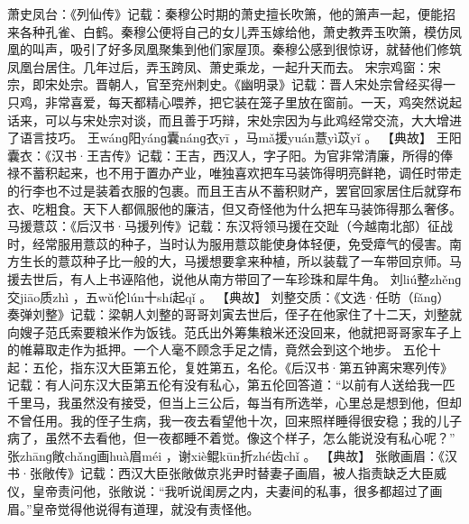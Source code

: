 \documentclass[12pt,UTF8]{ctexbook}
\begin{document}
萧史凤台：《列仙传》记载：秦穆公时期的萧史擅长吹箫，他的箫声一起，便能招来各种孔雀、白鹤。秦穆公便将自己的女儿弄玉嫁给他，萧史教弄玉吹箫，模仿凤凰的叫声，吸引了好多凤凰聚集到他们家屋顶。秦穆公感到很惊讶，就替他们修筑凤凰台居住。几年过后，弄玉跨凤、萧史乘龙，一起升天而去。
宋宗鸡窗：宋宗，即宋处宗。晋朝人，官至兖州刺史。《幽明录》记载：晋人宋处宗曾经买得一只鸡，非常喜爱，每天都精心喂养，把它装在笼子里放在窗前。一天，鸡突然说起话来，可以与宋处宗对谈，而且善于巧辩，宋处宗因为与此鸡经常交流，大大增进了语言技巧。
王wánɡ阳yánɡ囊nánɡ衣yī
，马mǎ援yuán薏yì苡yǐ
。
【典故】
王阳囊衣：《汉书·王吉传》记载：王吉，西汉人，字子阳。为官非常清廉，所得的俸禄不蓄积起来，也不用于置办产业，唯独喜欢把车马装饰得明亮鲜艳，调任时带走的行李也不过是装着衣服的包裹。而且王吉从不蓄积财产，罢官回家居住后就穿布衣、吃粗食。天下人都佩服他的廉洁，但又奇怪他为什么把车马装饰得那么奢侈。
马援薏苡：《后汉书·马援列传》记载：东汉将领马援在交趾（今越南北部）征战时，经常服用薏苡的种子，当时认为服用薏苡能使身体轻便，免受瘴气的侵害。南方生长的薏苡种子比一般的大，马援想要拿来种植，所以装载了一车带回京师。马援去世后，有人上书诬陷他，说他从南方带回了一车珍珠和犀牛角。
刘liú整zhěnɡ交jiāo质zhì
，五wǔ伦lún十shí起qǐ
。
【典故】
刘整交质：《文选·任昉（fǎnɡ）奏弹刘整》记载：梁朝人刘整的哥哥刘寅去世后，侄子在他家住了十二天，刘整就向嫂子范氏索要粮米作为饭钱。范氏出外筹集粮米还没回来，他就把哥哥家车子上的帷幕取走作为抵押。一个人毫不顾念手足之情，竟然会到这个地步。
五伦十起：五伦，指东汉大臣第五伦，复姓第五，名伦。《后汉书·第五钟离宋寒列传》记载：有人问东汉大臣第五伦有没有私心，第五伦回答道：“以前有人送给我一匹千里马，我虽然没有接受，但当上三公后，每当有所选举，心里总是想到他，但却不曾任用。我的侄子生病，我一夜去看望他十次，回来照样睡得很安稳；我的儿子病了，虽然不去看他，但一夜都睡不着觉。像这个样子，怎么能说没有私心呢？”
张zhānɡ敞chǎnɡ画huà眉méi
，谢xiè鲲kūn折zhé齿chǐ
。
【典故】
张敞画眉：《汉书·张敞传》记载：西汉大臣张敞做京兆尹时替妻子画眉，被人指责缺乏大臣威仪，皇帝责问他，张敞说：“我听说闺房之内，夫妻间的私事，很多都超过了画眉。”皇帝觉得他说得有道理，就没有责怪他。
\end{document}
